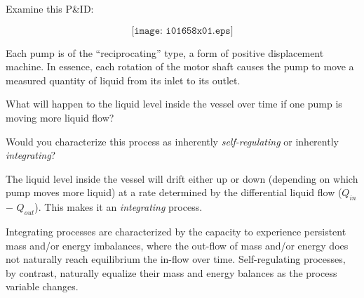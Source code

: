 

Examine this P\&ID:

$$\texttt{[image: i01658x01.eps]}$$

Each pump is of the ``reciprocating'' type, a form of positive displacement machine.  In essence, each rotation of the motor shaft causes the pump to move a measured quantity of liquid from its inlet to its outlet.

What will happen to the liquid level inside the vessel over time if one pump is moving more liquid flow?
 
\vskip 10pt

Would you characterize this process as inherently {\it self-regulating} or inherently {\it integrating}?







The liquid level inside the vessel will drift either up or down (depending on which pump moves more liquid) at a rate determined by the differential liquid flow ($Q_{in}$ $-$ $Q_{out}$).  This makes it an {\it integrating} process.

\vskip 10pt

Integrating processes are characterized by the capacity to experience persistent mass and/or energy imbalances, where the out-flow of mass and/or energy does not naturally reach equilibrium the in-flow over time.  Self-regulating processes, by contrast, naturally equalize their mass and energy balances as the process variable changes.











